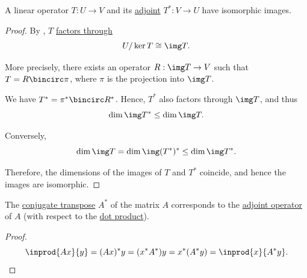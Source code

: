 \begin{proposition}\label{thm:image_of_adjoint}
  A linear operator \( T: U \to V \) and its \hyperref[def:adjoint_operator]{adjoint} \( T^*: V \to U \) have isomorphic images.
\end{proposition}
\begin{proof}
  By , \( T \) \hyperref[def:factors_through]{factors through}
  \begin{equation*}
    U / \ker T \cong \img T.
  \end{equation*}

  More precisely, there exists an operator \( R: \img T \to V \) such that \( T = R \bincirc \pi \), where \( \pi \) is the projection into \( \img T \).

  We have \( T^* = \pi^* \bincirc R^* \). Hence, \( T^* \) also factors through \( \img T \), and thus
  \begin{equation*}
    \dim \img T^* \leq \dim \img T.
  \end{equation*}

  Conversely,
  \begin{equation*}
    \dim \img T = \dim \img (T^*)^* \leq \dim \img T^*.
  \end{equation*}

  Therefore, the dimensions of the images of \( T \) and \( T^* \) coincide, and hence the images are isomorphic.
\end{proof}

\begin{proposition}\label{thm:conjugate_transpose}
  The \hyperref[def:conjugate_transpose]{conjugate transpose} \( A^* \) of the matrix \( A \) corresponds to the \hyperref[def:adjoint_operator]{adjoint operator} of \( A \) (with respect to the \hyperref[def:inner_product_space]{dot product}).
\end{proposition}
\begin{proof}
  \begin{equation*}
    \inprod {Ax} {y}
    =
    (Ax)^* y
    =
    (x^* A^*) y
    =
    x^* (A^* y)
    =
    \inprod {x} {A^* y}.
  \end{equation*}
\end{proof}

